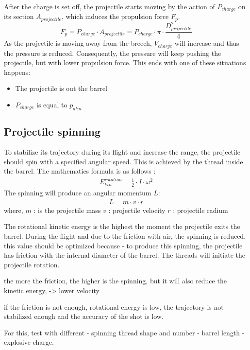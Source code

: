 \documentclass[12pt,a4paper]{article}
\begin{document}
After the charge is set off, the projectile starts moving by the action of $P_{charge}$ on its section $A_{projectile}$, which induces the propulsion force $F_p$. 
\begin{equation}
	F_p = P_{charge} \cdot A_{projectile} =  P_{charge} \cdot \pi \cdot \frac{D_{projectile}^2}{4}
\end{equation}
As the projectile is moving away from the breech, $ V_{charge}$ will increase and thus the pressure is reduced. Consequently, the pressure will keep pushing the projectile, but with lower propulsion force. This ends with one of these situations happens:  
\begin{itemize}
	\item The projectile is out the barrel
	\item $P_{charge}$ is equal to $p_{atm}$
\end{itemize}

\subsection{Projectile spinning}
To stabilize its trajectory during its flight and increase the range, the projectile should spin with a specified angular speed. This is achieved by the thread inside the barrel. The mathematics formula is as follows :  
\begin{eqnarray}
	E_{kin}^{rotation} = \frac{1}{2} \cdot I \cdot \omega ^ 2
\end{eqnarray}
The spinning will produce an angular momentum $L$:
\begin{eqnarray}
	L = m \cdot v \cdot r
\end{eqnarray}
where, 
$m$ : is the projectile mass
$v$ : projectile velocity
$r$ : projectile radium

The rotational kinetic energy is the highest the moment the projectile exits the barrel. During the flight and due to the friction with air, the spinning is reduced.
this value should be optimized because
- to produce this spinning, the projectile has friction with the internal diameter of the barrel. The threads will initiate the projectile rotation. 

the more the friction, the higher is the spinning, but it will also reduce the kinetic energy, -> lower velocity

if the friction is not enough, rotational energy is low, the trajectory is not stabilized enough and the accuracy of the shot is low. 

For this, test with different 
- spinning thread shape and number
- barrel length
- explosive charge. 
\end{document}
